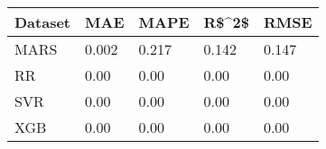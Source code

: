 \begin{tabular}{lllll}
\toprule
Dataset &   MAE &  MAPE & R\$\textasciicircum 2\$ &  RMSE \\
\midrule
   MARS & 0.002 & 0.217 & 0.142 & 0.147 \\
     RR &  0.00 &  0.00 &  0.00 &  0.00 \\
    SVR &  0.00 &  0.00 &  0.00 &  0.00 \\
    XGB &  0.00 &  0.00 &  0.00 &  0.00 \\
\bottomrule
\end{tabular}
